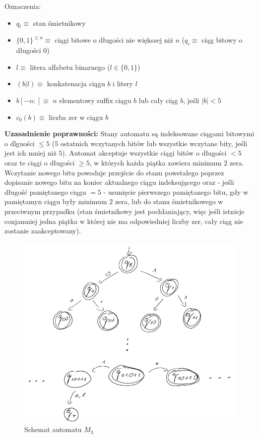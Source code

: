 \documentclass[12pt]{article}
\begin{document}
    \noindent \newline Oznaczenia:
    \begin{itemize}
        \item $q_t \equiv$ stan śmietnikowy
        \item $\{0, 1\}^{\leq n} \equiv$ ciągi bitowe o długości nie większej niż $n$ ($q_\epsilon \equiv$ ciąg bitowy o długości 0)
        \item $l \equiv$ litera alfabetu binarnego ($l \in \{0, 1\}$)
        \item $(b|l) \equiv$ konkatenacja ciągu $b$ i litery $l$
        \item $b[-n:] \equiv$ $n$ elementowy suffix ciągu  $b$ lub cały ciąg $b$, jeśli $|b| < 5$
        \item $c_0(b) \equiv$ liczba zer w ciągu $b$
    \end{itemize}

    \noindent \newline \textbf{Uzasadnienie poprawności:} \newline
    Stany automatu są indeksowane ciągami bitowymi o dlguości $\leq 5$ ($5$ ostatnich wczytanych bitów
    lub wszystkie wczytane bity, jeśli jest ich mniej niż $5$). Automat akceptuje wszystkie ciągi bitów o długości
    $< 5$ oraz te ciągi o długości $\geq 5$, w których każda piątka zawiera minimum $2$ zera. Wczytanie nowego bitu
    powoduje przejście do stanu powstałego poprzez dopisanie nowego bitu na koniec aktualnego ciągu indeksującego oraz -
    jeśli długość pamiętanego ciągu $= 5$ - usunięcie pierwszego pamiętanego bitu, gdy w pamiętamyn ciągu były minimum $2$ zera, lub
    do stanu śmietnikowego w przeciwnym przypadku (stan śmietnikowy jest pochłaniający, więc jeśli istnieje conjamniej
    jedna piątka w której nie ma odpowiedniej liczby zer, cały ciąg nie zostanie zaakceptowany).

    \newpage

    \begin{figure}[h]
        \centering
        \includegraphics[width=\linewidth]{img/m3.png}
        \caption{Schemat automatu $M_3$}
        \label{fig:m3}
    \end{figure}
\end{document}
